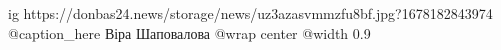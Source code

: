  
 
 
 
 

\ifcmt
  ig https://donbas24.news/storage/news/uz3azasvmmzfu8bf.jpg?1678182843974
	@caption_here Віра Шаповалова 
  @wrap center
  @width 0.9
\fi
